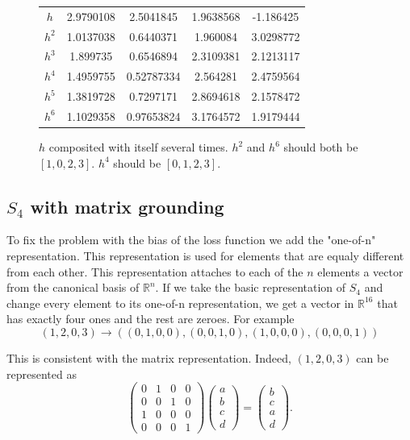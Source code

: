 \begin{figure}
\center
\caption{$h$ composited with itself several times. $h^2$ and $h^6$ should both be $[1,0,2,3]$. $h^4$ should be $[0,1,2,3]$.}
\label{table:s4_half_basic_gen}
\begin{tabular}{c|cccc}
$h$   & 2.9790108 & 2.5041845 & 1.9638568 & -1.186425\\
$h^2$ & 1.0137038 & 0.6440371 & 1.960084 & 3.0298772\\
$h^3$ & 1.899735 & 0.6546894 & 2.3109381 & 2.1213117\\
$h^4$ & 1.4959755 & 0.52787334 & 2.564281 & 2.4759564\\
$h^5$ & 1.3819728 & 0.7297171 & 2.8694618 & 2.1578472\\
$h^6$ & 1.1029358 & 0.97653824 & 3.1764572 & 1.9179444\\

\end{tabular}
\end{figure}

\subsection{$S_4$ with matrix grounding}
To fix the problem with the bias of the loss function we add the "one-of-n" representation. This representation is used for elements that are equaly different from each other. This representation attaches to each of the $n$ elements a vector from the canonical basis of $\mathbb{R}^n$. If we take the basic representation of $S_4$ and change every element to its one-of-n representation, we get a vector in $\mathbb{R}^{16}$ that has exactly four ones and the rest are zeroes. For example 
$$(1,2,0,3)\rightarrow \left((0,1,0,0),(0,0,1,0),(1,0,0,0),(0,0,0,1)\right)$$

This is consistent with the matrix representation. Indeed, $(1,2,0,3)$ can be represented as
$$
\left(
\begin{matrix}
0 & 1 & 0 & 0\\
0 & 0 & 1 & 0\\
1 & 0 & 0 & 0\\
0 & 0 & 0 & 1
\end{matrix}
\right)
\left(
\begin{matrix}
a\\
b\\
c\\
d
\end{matrix}
\right)
=
\left(
\begin{matrix}
b\\
c\\
a\\
d
\end{matrix}
\right).
$$

